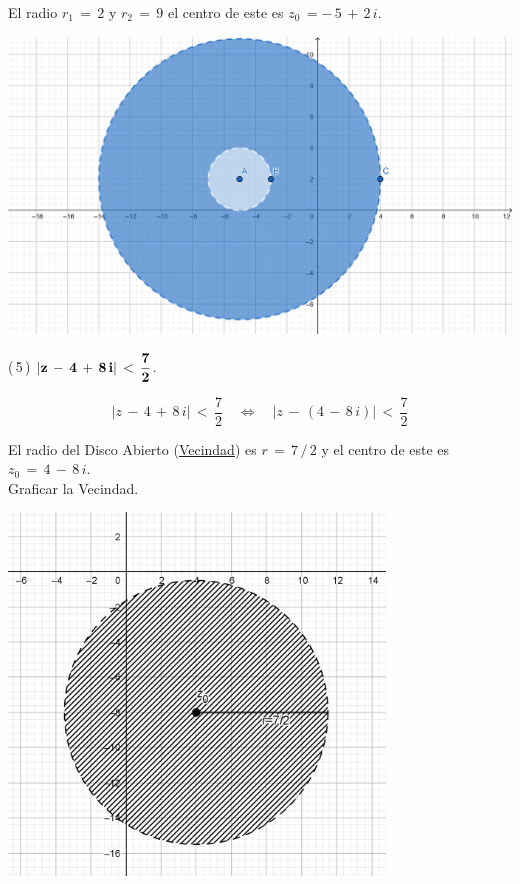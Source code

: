 \documentclass[a4paper,11pt,openany]{book}
\begin{document}
El radio $r_{1}\,=\,2$ y $r_{2}\,=\,9$ el centro de este es $z_{0}\,=-\,5\,+\,2\,i$.\\

\begin{center}
    \includegraphics[width=15cm]{Gra-Ej-4.png}
\end{center}

\textcolor{ao(english)}{(\,5\,)} $\bf{|z\,-\,4\,+\,8\,i|\,<\,\dfrac{7}{2}}$.

$$|z\,-\,4\,+\,8\,i|\,<\,\dfrac{7}{2} \quad\iff\quad |z\,-\,(4\,-\,8\,i)|\,<\,\dfrac{7}{2}$$

El radio del Disco Abierto (\underline{Vecindad}) es $r\,=\,7\,/\,2$ y el centro de este es $z_{0}\,=\,4\,-\,8\,i$.\\

\textcolor{ao(english)}{} Graficar la Vecindad.

\begin{center}
    \includegraphics[width=10cm]{Gra-Ej-5.png}
\end{center}
\end{document}
